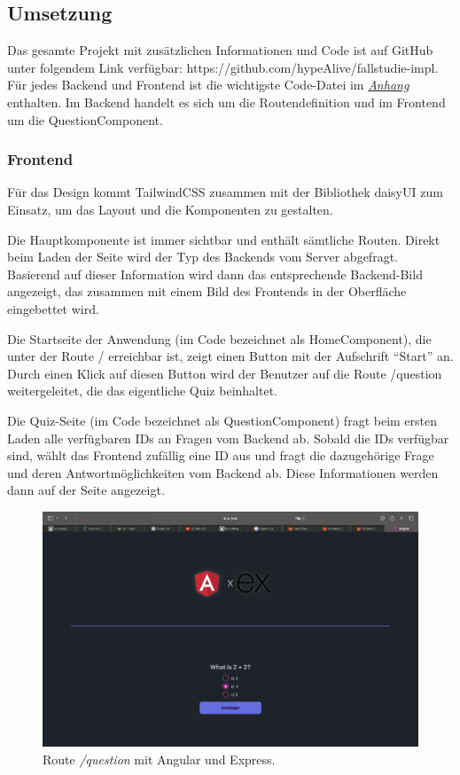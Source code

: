 \documentclass[biblatex]{lni}
\begin{document}
\subsection{Umsetzung}

Das gesamte Projekt mit zusätzlichen Informationen und Code ist auf GitHub unter folgendem Link verfügbar: https://github.com/hypeAlive/fallstudie-impl. \cite{fImpl}
Für jedes Backend und Frontend ist die wichtigste Code-Datei im \hyperref[sec:anhang]{\textit{Anhang}} enthalten.
Im Backend handelt es sich um die Routendefinition und im Frontend um die QuestionComponent.

\subsubsection{Frontend}

Für das Design kommt Tailwind\ac{CSS} zusammen mit der Bibliothek daisyUI zum Einsatz,
um das Layout und die Komponenten zu gestalten.

Die Hauptkomponente ist immer sichtbar und enthält sämtliche Routen.
Direkt beim Laden der Seite wird der Typ des Backends vom Server abgefragt.
Basierend auf dieser Information wird dann das entsprechende Backend-Bild angezeigt,
das zusammen mit einem Bild des Frontends in der Oberfläche eingebettet wird.

Die Startseite der Anwendung (im Code bezeichnet als HomeComponent),
die unter der Route / erreichbar ist, zeigt einen Button mit der Aufschrift “Start” an.
Durch einen Klick auf diesen Button wird der Benutzer auf die Route /question weitergeleitet,
die das eigentliche Quiz beinhaltet.

Die Quiz-Seite (im Code bezeichnet als QuestionComponent) fragt beim ersten Laden alle verfügbaren \ac{ID}s an Fragen vom Backend ab.
Sobald die \ac{ID}s verfügbar sind,
wählt das Frontend zufällig eine \ac{ID} aus und fragt die dazugehörige Frage und deren Antwortmöglichkeiten vom Backend ab.
Diese Informationen werden dann auf der Seite angezeigt.

\begin{figure}
  \centering
  \includegraphics[width=.8\textwidth]{question-component}
  \caption{Route \textit{/question} mit Angular und Express.}
  \label{fig:question-component}
\end{figure}
\end{document}

